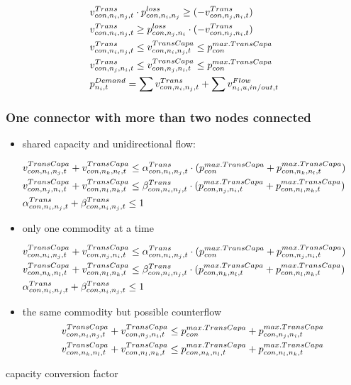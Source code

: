 \begin{align} \label{eq:transconstraints1}
	&\vTrans \cdot \ptransloss \geq (-\vTrans[\connection,\node_j,\node_i,t])\\
	&\vTrans  \geq  \ptransloss[\connection,\node_j,\node_i] \cdot (-\vTrans[\connection,\node_j,\node_i,t])\\
	&\vTrans \leq \vTranCapa \leq \pMaxTransCapa \\
	&\vTrans[\connection,\node_j,\node_i,t] \leq \vTranCapa[\connection,\node_j,\node_i,t] \leq \pMaxTransCapa\\
	&\pDemand[\node_i,t] = \sum \vTrans + \sum \vFlow [\node_i,u,in/out,t]
\end{align}
\subsubsection{One connector with more than two nodes connected}
\begin{figure}[h!]
			\centering
	
	\caption{}
	\label{}
\end{figure}
\begin{itemize}
	\item shared capacity and unidirectional flow:
\end{itemize}
\begin{align} \label{eq:transconstraints1}
	&\vTranCapa + \vTranCapa[con,n_k,n_l,t] \leq \al \cdot (\pMaxTransCapa + \pMaxTransCapa[con,n_k,n_l,t])\\
	&\vTranCapa[con,n_j,n_i,t] + \vTranCapa[con,n_l,n_k,t]  \leq \be \cdot (\pMaxTransCapa[con,n_j,n_i,t]  + \pMaxTransCapa[con,n_l,n_k,t] )\\
	&\al + \be \leq 1
\end{align}
\begin{itemize}
	\item only one commodity at a time
\end{itemize}
\begin{align} \label{eq:transconstraints1}
	&\vTranCapa + \vTranCapa[con,n_j,n_i,t] \leq \al \cdot (\pMaxTransCapa + \pMaxTransCapa[con,n_j,n_i,t])\\
	&\vTranCapa[con,n_k,n_l,t] + \vTranCapa[con,n_l,n_k,t] \leq \be \cdot (\pMaxTransCapa[con,n_k,n_l,t]  + \pMaxTransCapa[con,n_l,n_k,t])\\
	&\al + \be \leq 1
\end{align}
\begin{itemize}
	\item the same commodity but possible counterflow
	\begin{align} \label{eq:transconstraints1}
		&\vTranCapa + \vTranCapa[con,n_j,n_i,t] \leq \pMaxTransCapa + \pMaxTransCapa[con,n_j,n_i,t]\\
		&\vTranCapa[con,n_k,n_l,t] + \vTranCapa[con,n_l,n_k,t] \leq \pMaxTransCapa[con,n_k,n_l,t]  + \pMaxTransCapa[con,n_l,n_k,t]
	\end{align}
\end{itemize}


capacity conversion factor
